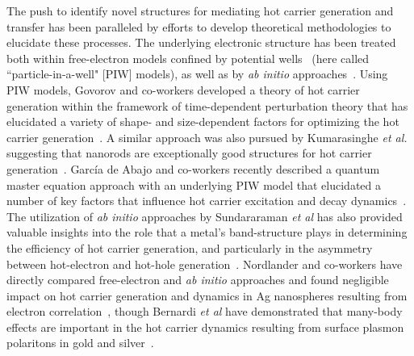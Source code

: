 \documentclass[journal=jpclcd,manuscript=article]{achemso}
\begin{document}
The push to identify novel structures for mediating hot carrier generation and transfer has been paralleled by 
efforts to develop theoretical methodologies to elucidate these processes.  The underlying electronic
structure has been treated both within free-electron models confined by potential wells~\cite{GZG_JPCC_2013,ZG_JPCC_2014,MLK_ACSNano_2014,KPB_SciRep_2015,SAG_ACSPhotonics_2016} (here called
``particle-in-a-well" [PIW] models), as well as by {\it ab initio} approaches~\cite{SNJ_NatComm_2014,BMN_NatComm_2015,MWW_NatComm_2015,BSN_ACSNano_2016}.
Using PIW models, Govorov and co-workers developed a theory of 
hot carrier generation within the framework of time-dependent perturbation theory that
has elucidated a variety of shape- and size-dependent factors for optimizing 
the hot carrier generation~\cite{GZG_JPCC_2013,ZG_JPCC_2014}.  A similar approach was also pursued by Kumarasinghe {\it et al.} suggesting
that nanorods are exceptionally good structures for hot carrier generation~\cite{KPB_SciRep_2015}.  Garc\'ia de Abajo and co-workers recently described a 
quantum master equation approach with an underlying PIW model that elucidated a number of key factors that influence
hot carrier excitation and decay dynamics~\cite{SAG_ACSPhotonics_2016}.  The utilization of {\it ab initio} approaches by Sundararaman {\it et al} 
has also provided valuable insights into the role that a metal's band-structure plays
in determining the efficiency of hot carrier generation, and particularly in the asymmetry between hot-electron
and hot-hole generation~\cite{SNJ_NatComm_2014}.  Nordlander and co-workers have directly compared free-electron and {\it ab initio} approaches
and found negligible impact on hot carrier generation and dynamics in Ag nanospheres resulting from electron correlation~\cite{MLK_ACSNano_2014}, 
though Bernardi {\it et al} have demonstrated that many-body effects are important in the hot carrier dynamics resulting
from surface plasmon polaritons in gold and silver~\cite{BMN_NatComm_2015}.
\end{document}

